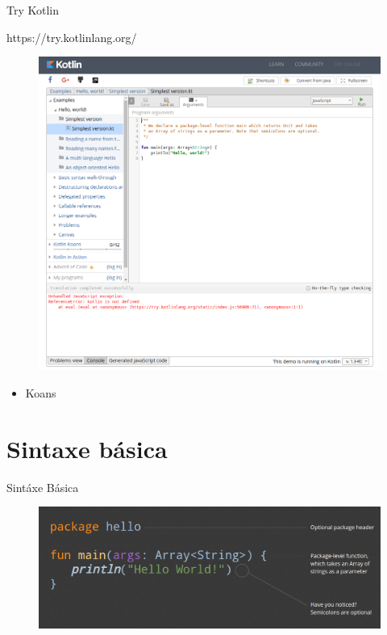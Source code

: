 \documentclass{beamer}
\begin{document}
\begin{frame}{Try Kotlin}

	https://try.kotlinlang.org/
	
	\begin{figure}[!htb]
		\centering
		\includegraphics[scale=.20]{trykotlin.png}
	\end{figure}
	
	\begin{itemize}
		\item Koans
	\end{itemize}
	
\end{frame}





\section{Sintaxe básica}
	\begin{frame}{Sintáxe Básica}
		\begin{figure}[!htb]
			\centering
			\includegraphics[scale=.23]{helloworld.png}
		\end{figure}
	\end{frame}
\end{document}
